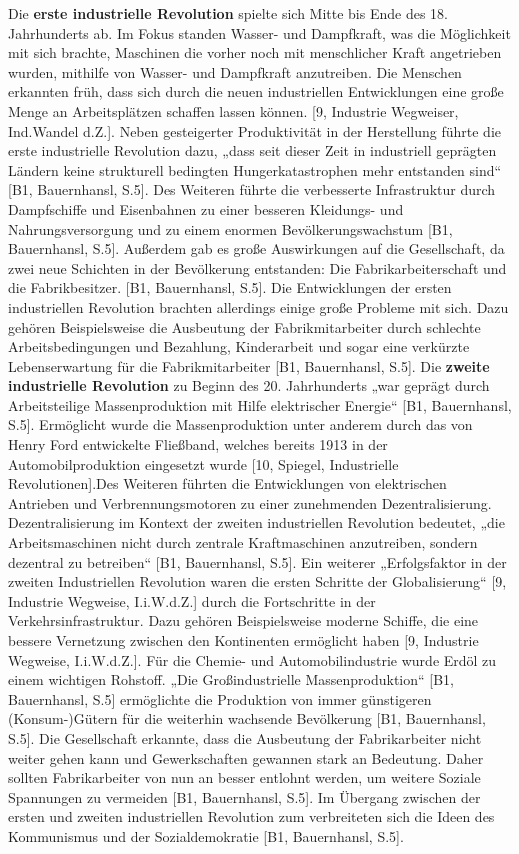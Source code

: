 Die \textbf{erste industrielle Revolution} spielte sich Mitte bis Ende des 18. Jahrhunderts ab. Im Fokus standen Wasser- und Dampfkraft, was die Möglichkeit mit sich brachte, Maschinen die vorher noch mit menschlicher Kraft angetrieben wurden, mithilfe von Wasser- und Dampfkraft anzutreiben. Die Menschen erkannten früh, dass sich durch die neuen industriellen Entwicklungen eine große Menge an Arbeitsplätzen schaffen lassen können. [9, Industrie Wegweiser, Ind.Wandel d.Z.]. Neben gesteigerter Produktivität in der Herstellung führte die erste industrielle Revolution dazu, „dass seit dieser Zeit in industriell geprägten Ländern keine strukturell bedingten Hungerkatastrophen mehr entstanden sind“ [B1, Bauernhansl, S.5]. Des Weiteren führte die verbesserte Infrastruktur durch Dampfschiffe und Eisenbahnen zu einer besseren Kleidungs- und Nahrungsversorgung und zu einem enormen Bevölkerungswachstum [B1, Bauernhansl, S.5]. Außerdem gab es große Auswirkungen auf die Gesellschaft, da zwei neue Schichten in der Bevölkerung entstanden: Die Fabrikarbeiterschaft und die Fabrikbesitzer. [B1, Bauernhansl, S.5]. Die Entwicklungen der ersten industriellen Revolution brachten allerdings einige große Probleme mit sich. Dazu gehören Beispielsweise die Ausbeutung der Fabrikmitarbeiter durch schlechte Arbeitsbedingungen und Bezahlung, Kinderarbeit und sogar eine verkürzte Lebenserwartung für die Fabrikmitarbeiter [B1, Bauernhansl, S.5].
\newline\newline
Die \textbf{zweite industrielle Revolution} zu Beginn des 20. Jahrhunderts „war geprägt durch Arbeitsteilige Massenproduktion mit Hilfe elektrischer Energie“ [B1, Bauernhansl, S.5]. Ermöglicht wurde die Massenproduktion unter anderem durch das von Henry Ford entwickelte Fließband, welches bereits 1913 in der Automobilproduktion eingesetzt wurde [10, Spiegel, Industrielle Revolutionen].Des Weiteren führten die Entwicklungen von elektrischen Antrieben und Verbrennungsmotoren zu einer zunehmenden Dezentralisierung. Dezentralisierung im Kontext der zweiten industriellen Revolution bedeutet, „die Arbeitsmaschinen nicht durch zentrale Kraftmaschinen anzutreiben, sondern dezentral zu betreiben“ [B1, Bauernhansl, S.5]. Ein weiterer „Erfolgsfaktor in der zweiten Industriellen Revolution waren die ersten Schritte der Globalisierung“ [9, Industrie Wegweise, I.i.W.d.Z.] durch die Fortschritte in der Verkehrsinfrastruktur. Dazu gehören Beispielsweise moderne Schiffe, die eine bessere Vernetzung zwischen den Kontinenten ermöglicht haben [9, Industrie Wegweise, I.i.W.d.Z.]. Für die Chemie- und Automobilindustrie wurde Erdöl zu einem wichtigen Rohstoff. „Die Großindustrielle Massenproduktion“ [B1, Bauernhansl, S.5] ermöglichte die Produktion von immer günstigeren (Konsum-)Gütern für die weiterhin wachsende Bevölkerung [B1, Bauernhansl, S.5]. Die Gesellschaft erkannte, dass die Ausbeutung der Fabrikarbeiter nicht weiter gehen kann und Gewerkschaften gewannen stark an Bedeutung. Daher sollten Fabrikarbeiter von nun an besser entlohnt werden, um weitere Soziale Spannungen zu vermeiden [B1, Bauernhansl, S.5]. Im Übergang zwischen der ersten und zweiten industriellen Revolution zum verbreiteten sich die Ideen des Kommunismus und der Sozialdemokratie [B1, Bauernhansl, S.5].
